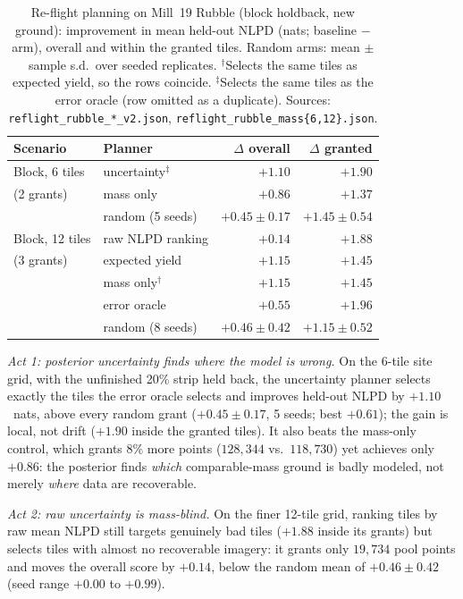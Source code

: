 \begin{table}[!t]
\caption{Re-flight planning on Mill~19 Rubble (block holdback, new
ground): improvement in mean held-out NLPD (nats; baseline $-$ arm),
overall and within the granted tiles. Random arms: mean $\pm$ sample
s.d.\ over seeded replicates. $^{\dagger}$Selects the same tiles
as expected yield, so the rows coincide.
$^{\ddagger}$Selects the same tiles as the error oracle (row
omitted as a duplicate). Sources:
\texttt{reflight\_rubble\_*\_v2.json},
\texttt{reflight\_rubble\_mass\{6,12\}.json}.}
\label{tab:reflight}
\centering
\setlength{\tabcolsep}{4pt}
\begin{tabular}{llrr}
\hline
Scenario & Planner & $\Delta$ overall & $\Delta$ granted \\
\hline
Block, 6 tiles    & uncertainty$^{\ddagger}$ & $+1.10$ & $+1.90$ \\
(2 grants)        & mass only          & $+0.86$ & $+1.37$ \\
                  & random (5 seeds)   & $+0.45 \pm 0.17$ & $+1.45 \pm 0.54$ \\
\hline
Block, 12 tiles   & raw NLPD ranking   & $+0.14$ & $+1.88$ \\
(3 grants)        & expected yield     & $+1.15$ & $+1.45$ \\
                  & mass only$^{\dagger}$ & $+1.15$ & $+1.45$ \\
                  & error oracle       & $+0.55$ & $+1.96$ \\
                  & random (8 seeds)   & $+0.46 \pm 0.42$ & $+1.15 \pm 0.52$ \\
\hline
\end{tabular}
\end{table}

 \emph{Act 1: posterior uncertainty finds where the model is wrong.} On
the 6-tile site grid, with the unfinished 20\% strip held back, the
uncertainty
planner selects exactly the tiles the error oracle selects and
improves held-out NLPD by $+1.10$~nats, above every random grant
($+0.45\pm0.17$, 5 seeds; best $+0.61$); the gain is local, not drift
($+1.90$ inside the granted tiles). It also beats the mass-only
control, which grants 8\% more points ($128{,}344$ vs.\ $118{,}730$)
yet achieves only $+0.86$: the posterior finds \emph{which}
comparable-mass ground is badly modeled, not merely \emph{where} data
are recoverable.

 \emph{Act 2: raw uncertainty is mass-blind.} On the finer 12-tile grid,
ranking tiles by raw mean NLPD still targets genuinely bad tiles
($+1.88$ inside its grants) but selects tiles with almost no
recoverable imagery: it grants only $19{,}734$ pool points and moves
the overall score by $+0.14$, below the random mean of
$+0.46\pm0.42$ (seed range $+0.00$ to $+0.99$).

